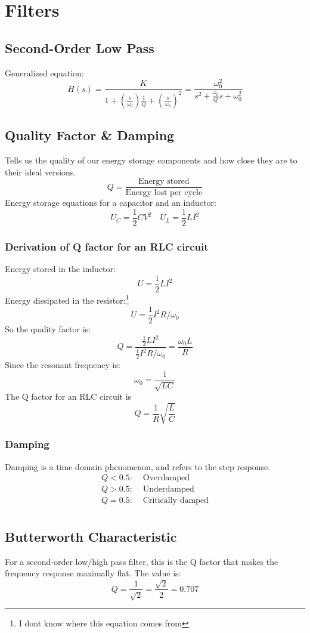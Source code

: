 \chapter{Filters}

\section{Second-Order Low Pass}
Generalized equation:
\[H(s)=\frac{K}{1+\left(\frac{s}{\omega_0}\right)\frac{1}{Q} + \left(\frac{s}{\omega_0}\right)^2} = \frac{\omega_0^2}{s^2 + \frac{\omega_0}{Q}s + \omega_0^2}\]

\section{Quality Factor \& Damping}
Tells us the quality of our energy storage components and how close they are to their ideal versions.
\[Q=\frac{\text{Energy stored}}{\text{Energy lost per cycle}}\]
Energy storage equations for a capacitor and an inductor:
\[U_C=\frac{1}{2}CV^2 \quad U_L=\frac{1}{2}LI^2\]
\subsection{Derivation of Q factor for an RLC circuit}
Energy stored in the inductor:
\[U=\frac{1}{2}LI^2\]
Energy dissipated in the resistor:\footnote{I dont know where this equation comes from}
\[U=\frac{1}{2}I^2 R/\omega_0\]
So the quality factor is:
\[Q=\frac{\frac{1}{2}LI^2}{\frac{1}{2}I^2 R/\omega_0}=\frac{\omega_0 L}{R}\]
Since the resonant frequency is:
\[\omega_0=\frac{1}{\sqrt{LC}}\]
The Q factor for an RLC circuit is
\[Q=\frac{1}{R}\sqrt{\frac{L}{C}}\]

\subsection{Damping}
Damping is a time domain phenomenon, and refers to the step response.
\begin{align*}
Q<0.5:&\text{ Overdamped}\\
Q>0.5:&\text{ Underdamped}\\
Q=0.5:&\text{ Critically damped}\\
\end{align*}




\section{Butterworth Characteristic}
For a second-order low/high pass filter, this is the Q factor that makes the frequency response maximally flat. The value is:
\[Q=\frac{1}{\sqrt{2}}=\frac{\sqrt{2}}{2}=0.707\]

